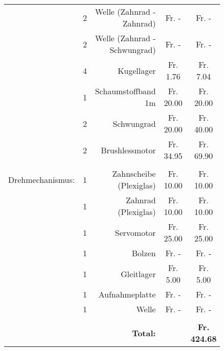\begin{figure}[h!]
\begin{tabular}{rcrcc}
               & 2     & Welle (Zahnrad - Zahnrad) &  Fr. -    &  Fr. -    \\
               & 2     & Welle (Zahnrad - Schwungrad) &  Fr. -    &  Fr. -    \\
          & 4     & Kugellager &  Fr. 1.76  &  Fr. 7.04  \\
          & 1     & Schaumstoffband 1m &  Fr. 20.00  &  Fr. 20.00  \\
          & 2     & Schwungrad &  Fr. 20.00  &  Fr. 40.00  \\
          & 2     & Brushlessmotor &  Fr. 34.95  &  Fr.  69.90  \\
          &       &       &       &  \\
    Drehmechanismus: & 1     & Zahnscheibe (Plexiglas) &  Fr. 10.00  &  Fr. 10.00  \\
          & 1     & Zahnrad (Plexiglas) &  Fr. 10.00  &  Fr. 10.00  \\
          & 1     & Servomotor &  Fr. 25.00  &  Fr. 25.00  \\
          & 1     & Bolzen &  Fr. -    &  Fr. -    \\
          & 1     & Gleitlager &  Fr. 5.00  &  Fr. 5.00  \\
          & 1     & Aufnahmeplatte &  Fr.              -    &  Fr. -    \\
          & 1     & Welle &  Fr. -    &  Fr. -    \\
          &       &       &       &  \\
          &       & \textbf{Total:} & \textbf{} & \textbf{ Fr. 424.68 } \\

    \end{tabular}

\end{figure}